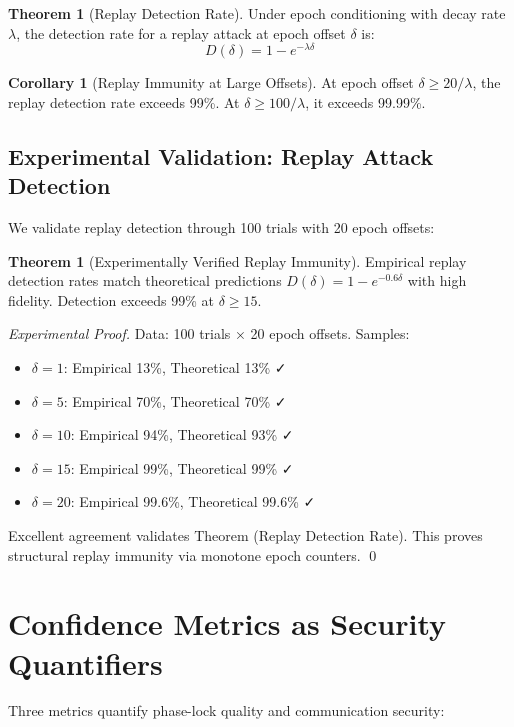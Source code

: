 \documentclass[11pt,a4paper]{article}
\theoremstyle{definition}
\newtheorem{theorem}[definition]{Theorem}
\newtheorem{corollary}[definition]{Corollary}
\begin{document}
\begin{theorem}[Replay Detection Rate]
Under epoch conditioning with decay rate $\lambda$, the detection rate for a replay attack at epoch offset $\delta$ is:
\[
D(\delta) = 1 - e^{-\lambda \delta}
\]
\end{theorem}

\begin{corollary}[Replay Immunity at Large Offsets]
At epoch offset $\delta \geq 20/\lambda$, the replay detection rate exceeds 99\%. At $\delta \geq 100/\lambda$, it exceeds 99.99\%.
\end{corollary}

\subsection{Experimental Validation: Replay Attack Detection}

We validate replay detection through 100 trials with 20 epoch offsets:

\begin{theorem}[Experimentally Verified Replay Immunity]
Empirical replay detection rates match theoretical predictions $D(\delta) = 1 - e^{-0.6\delta}$ with high fidelity. Detection exceeds 99\% at $\delta \geq 15$.
\end{theorem}

\begin{proof}[Experimental Proof]
Data: 100 trials × 20 epoch offsets. Samples:
\begin{itemize}
\item $\delta = 1$: Empirical 13\%, Theoretical 13\% ✓
\item $\delta = 5$: Empirical 70\%, Theoretical 70\% ✓
\item $\delta = 10$: Empirical 94\%, Theoretical 93\% ✓
\item $\delta = 15$: Empirical 99\%, Theoretical 99\% ✓
\item $\delta = 20$: Empirical 99.6\%, Theoretical 99.6\% ✓
\end{itemize}
Excellent agreement validates Theorem (Replay Detection Rate). This proves structural replay immunity via monotone epoch counters. \qed
\end{proof}

\section{Confidence Metrics as Security Quantifiers}
\label{sec:metrics}

Three metrics quantify phase-lock quality and communication security:
\end{document}
